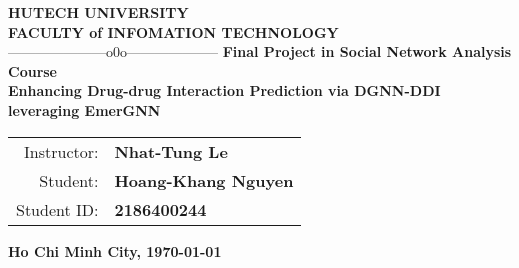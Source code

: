 \documentclass[12pt, a4paper,oneside]{book}
\begin{document}


\begin{titlepage}
\setlength{\baselineskip}{18truept}                                             %
\begin{center}
{\large\bf HUTECH UNIVERSITY}\\
{\large\bf FACULTY of INFOMATION TECHNOLOGY} \\
{---------------------o0o--------------------}
\vskip 4cm
{\bf Final Project in Social Network Analysis Course}\\[1cm]

\vskip 1cm
{\Large\bf \textbf{Enhancing Drug-drug Interaction Prediction via DGNN-DDI leveraging EmerGNN}}\\
\vskip 5cm

\begin{tabular}{r l}
Instructor:&{\bf Nhat-Tung Le}\\[0.5cm]
Student:&{\bf Hoang-Khang Nguyen}\\[0.5cm]
Student ID: &{\bf 2186400244}
\end{tabular}
\vfill
{\bf Ho Chi Minh City, \today}
\end{center}
\end{titlepage}

\setlength{\headheight}{14pt}

\thispagestyle{empty}
\tableofcontents
\listoffigures{} 
\listoftables{} 
\end{document}
